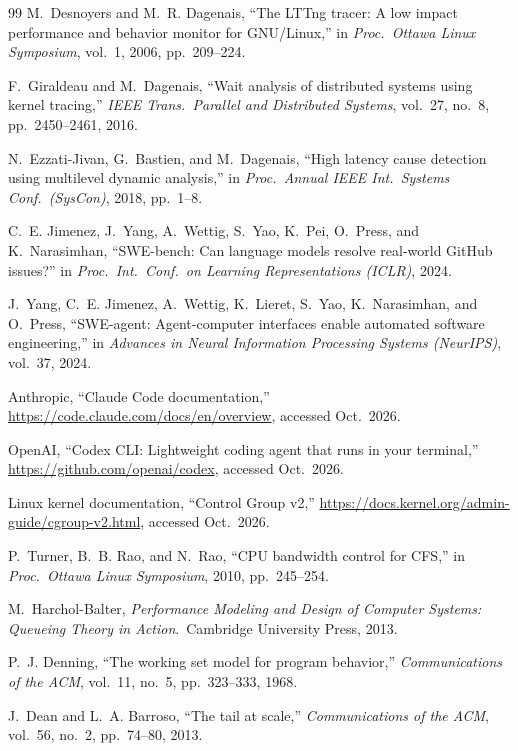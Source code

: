 \documentclass[10pt,conference]{IEEEtran}
\begin{document}
\begin{thebibliography}{99}
M.~Desnoyers and M.~R. Dagenais, ``The LTTng tracer: A low impact
performance and behavior monitor for GNU/Linux,'' in \emph{Proc.\ Ottawa
Linux Symposium}, vol.~1, 2006, pp.\ 209--224.

F.~Giraldeau and M.~Dagenais, ``Wait analysis of distributed systems using
kernel tracing,'' \emph{IEEE Trans.\ Parallel and Distributed Systems},
vol.~27, no.~8, pp.\ 2450--2461, 2016.

N.~Ezzati-Jivan, G.~Bastien, and M.~Dagenais, ``High latency cause
detection using multilevel dynamic analysis,'' in \emph{Proc.\ Annual IEEE
Int.\ Systems Conf.\ (SysCon)}, 2018, pp.\ 1--8.

C.~E. Jimenez, J.~Yang, A.~Wettig, S.~Yao, K.~Pei, O.~Press, and
K.~Narasimhan, ``SWE-bench: Can language models resolve real-world GitHub
issues?'' in \emph{Proc.\ Int.\ Conf.\ on Learning Representations
(ICLR)}, 2024.

J.~Yang, C.~E. Jimenez, A.~Wettig, K.~Lieret, S.~Yao, K.~Narasimhan, and
O.~Press, ``SWE-agent: Agent-computer interfaces enable automated software
engineering,'' in \emph{Advances in Neural Information Processing Systems
(NeurIPS)}, vol.~37, 2024.

Anthropic, ``Claude Code documentation,''
\url{https://code.claude.com/docs/en/overview}, accessed Oct.\ 2026.

OpenAI, ``Codex CLI: Lightweight coding agent that runs in your terminal,''
\url{https://github.com/openai/codex}, accessed Oct.\ 2026.

Linux kernel documentation, ``Control Group v2,''
\url{https://docs.kernel.org/admin-guide/cgroup-v2.html}, accessed Oct.\
2026.

P.~Turner, B.~B. Rao, and N.~Rao, ``CPU bandwidth control for CFS,'' in
\emph{Proc.\ Ottawa Linux Symposium}, 2010, pp.\ 245--254.

M.~Harchol-Balter, \emph{Performance Modeling and Design of Computer
Systems: Queueing Theory in Action}.\ Cambridge University Press, 2013.

P.~J. Denning, ``The working set model for program behavior,''
\emph{Communications of the ACM}, vol.~11, no.~5, pp.\ 323--333, 1968.

J.~Dean and L.~A. Barroso, ``The tail at scale,'' \emph{Communications of
the ACM}, vol.~56, no.~2, pp.\ 74--80, 2013.

\end{thebibliography}
\end{document}
